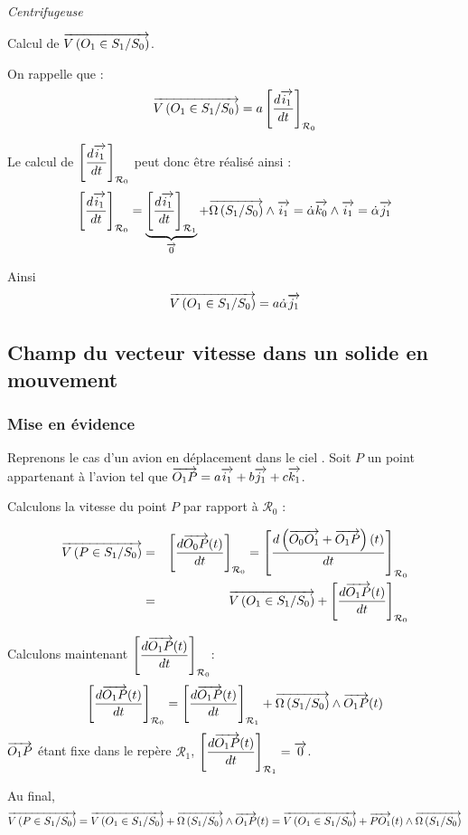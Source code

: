 \documentclass[10pt,oneside]{article}
\begin{document}
\begin{exemple}
\textit{Centrifugeuse}

Calcul de $\overrightarrow{V\left( {O_1} \in {S_1}/{S_0}\right)}$.

On rappelle que :
$$
\overrightarrow{V\left( {O_1} \in {S_1}/{S_0}\right)} 
= a \left[\dfrac{d  \overrightarrow{i_1} }{dt}\right]_{\mathcal{R}_0}
$$

Le calcul de $\left[\dfrac{d  \overrightarrow{i_1} }{dt}\right]_{\mathcal{R}_0}$ peut donc être réalisé ainsi : 
$$ 
\left[\dfrac{d  \overrightarrow{i_1} }{dt}\right]_{\mathcal{R}_0} = 
\underbrace{\left[\dfrac{d  \overrightarrow{i_1} }{dt}\right]_{\mathcal{R}_1}}_{\overrightarrow{0}} + \overrightarrow{\Omega\left( {S_1}/{S_0}\right)}\wedge \overrightarrow{i_1}
=\dot{\alpha}\overrightarrow{k_0}  \wedge \overrightarrow{i_1}
=\dot{\alpha} \overrightarrow{j_1}
$$

Ainsi 
$$
\overrightarrow{V\left( {O_1} \in {S_1}/{S_0}\right)} 
= a \dot{\alpha} \overrightarrow{j_1}
$$
\end{exemple}


\subsection{Champ du vecteur vitesse dans un solide en mouvement}

\subsubsection{Mise en évidence}
Reprenons le cas d'un avion en déplacement dans le ciel . Soit $P$ un point appartenant à l'avion tel que $\overrightarrow{O_1P} = a\overrightarrow{i_1} + b\overrightarrow{j_1} + c\overrightarrow{k_1}$. 

Calculons la vitesse du point $P$ par rapport à $\mathcal{R}_0$ :

\begin{eqnarray*}
\overrightarrow{V\left( {P} \in {S_1}/{S_0}\right)} & = &\left[\dfrac{d\overrightarrow{O_0 P}(t)}{dt}\right]_{\mathcal{R}_0}
= \left[\dfrac{d\left( \overrightarrow{O_0 O_1} + \overrightarrow{O_1P}\right)(t)}{dt}\right]_{\mathcal{R}_0} \\
&=&\overrightarrow{V\left( {O_1} \in {S_1}/{S_0}\right)}+\left[\dfrac{d\overrightarrow{O_1 P}(t)}{dt}\right]_{\mathcal{R}_0} \\
\end{eqnarray*}

Calculons maintenant $\left[\dfrac{d\overrightarrow{O_1 P}(t)}{dt}\right]_{\mathcal{R}_0}$:
$$
\left[\dfrac{d\overrightarrow{O_1 P}(t)}{dt}\right]_{\mathcal{R}_0} = 
\left[\dfrac{d\overrightarrow{O_1 P}(t)}{dt}\right]_{\mathcal{R}_1} 
+ \overrightarrow{\Omega\left( {S_1}/{S_0}\right)} \wedge \overrightarrow{O_1 P}(t)
$$
$\overrightarrow{O_1 P}$ étant fixe dans le repère $\mathcal{R}_1$, $\left[\dfrac{d\overrightarrow{O_1 P}(t)}{dt}\right]_{\mathcal{R}_1}=\overrightarrow{0}$.

Au final, 
$$
\overrightarrow{V\left( {P} \in {S_1}/{S_0}\right)} = \overrightarrow{V\left( {O_1} \in {S_1}/{S_0}\right)}+
\overrightarrow{\Omega\left( {S_1}/{S_0}\right)} \wedge \overrightarrow{O_1 P}(t)
= \overrightarrow{V\left( {O_1} \in {S_1}/{S_0}\right)}+
 \overrightarrow{P O_1}(t) \wedge \overrightarrow{\Omega\left( {S_1}/{S_0}\right)} 
$$
\end{document}
